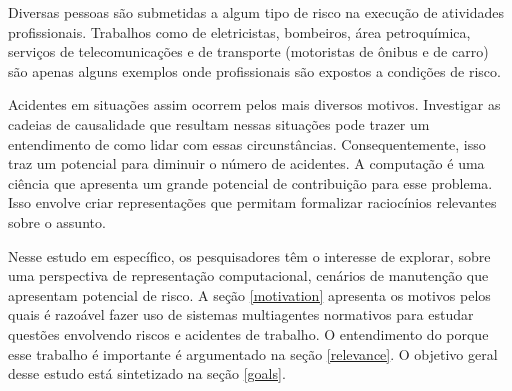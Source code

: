 Diversas pessoas são submetidas a algum tipo de risco na execução de atividades profissionais. Trabalhos como de eletricistas, bombeiros, área petroquímica, serviços de telecomunicações e de transporte (motoristas de ônibus e de carro) são apenas alguns exemplos onde profissionais são expostos a condições de risco.

Acidentes em situações assim ocorrem pelos mais diversos motivos. Investigar as cadeias de causalidade que resultam nessas situações pode trazer um entendimento de como lidar com essas circunstâncias. Consequentemente, isso traz um potencial para diminuir o número de acidentes. A computação é uma ciência que apresenta um grande potencial de contribuição para esse problema. Isso envolve criar representações que permitam formalizar raciocínios relevantes sobre o assunto.

Nesse estudo em específico, os pesquisadores têm o interesse de explorar, sobre uma perspectiva de representação computacional, cenários de manutenção que apresentam potencial de risco. A seção \ref{motivation} apresenta os motivos pelos quais é razoável fazer uso de sistemas multiagentes normativos para estudar questões envolvendo riscos e acidentes de trabalho. O entendimento do porque esse trabalho é importante é argumentado na seção \ref{relevance}. O objetivo geral desse estudo está sintetizado na seção \ref{goals}.